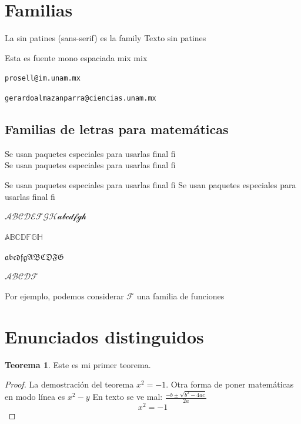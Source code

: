 \documentclass[10pt]{book}
\theoremstyle{definition}
\theoremstyle{theorem}
\newtheorem{teo}[defi]{Teorema}
\theoremstyle{remark}
\begin{document}
\section{Familias}\label{sec:familias}

La \textsf{sin patines} (sans-serif) es la family
{\sffamily Texto sin patines}

{\ttfamily Esta es fuente mono espaciada mix} mix

\texttt{prosell@im.unam.mx}

\texttt{gerardoalmazanparra@ciencias.unam.mx}


\subsection{Familias de letras para matemáticas}

Se usan paquetes especiales para usarlas final f{i}\\
Se usan paquetes especiales para usarlas final f{i}

\medskip

Se usan paquetes especiales para usarlas final f{i}
Se usan paquetes especiales para usarlas final f{i}



$\mathcal{ABCDEFGH abcdfgh}$ %

$\mathbb{ABCDFGH}$ %

$\mathfrak{abcdfg ABCDFG}$ %

$\mathscr{ABCDF}$ %

Por ejemplo, podemos considerar $\mathcal{F}$ una familia de funciones

\section{Enunciados distinguidos}

\begin{teo}
    Este es mi primer teorema.
\end{teo}
\begin{proof}
    La demostración del teorema $x^2=-1$. Otra forma de poner matemáticas en modo línea es \(x^2-y\) En texto se ve mal: $\frac{-b\pm\sqrt{b^2-4ac}}{2a}$
    \begin{equation*}
        x^2=-1
    \end{equation*}
\end{proof}
\end{document}
